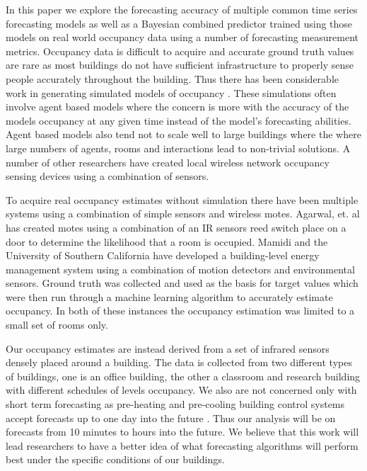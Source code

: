 \documentclass{acm_proc_article-sp}
\begin{document}
In this paper we explore the forecasting accuracy of multiple common time series forecasting models as well as a Bayesian combined predictor trained using those models on real world occupancy data using a number of forecasting measurement metrics.  Occupancy data is difficult to acquire and accurate ground truth values are rare as most buildings do not have sufficient infrastructure to properly sense people accurately throughout the building.  Thus there has been considerable work in generating simulated models of occupancy \cite{PAGE2008, GOLDSTEIN2010}.  These simulations often involve agent based models where the concern is more with the accuracy of the models occupancy at any given time instead of the model's forecasting abilities.   Agent based models also tend not to scale well to large buildings where the where large numbers of agents, rooms and interactions lead to non-trivial solutions. A number of other researchers have created local wireless network occupancy sensing devices using a combination of sensors.  

To acquire real occupancy estimates without simulation there have been multiple systems using a combination of simple sensors and wireless motes.  Agarwal, et. al \cite{Agarwal2010} has created motes using a combination of an IR sensors reed switch place on a door to determine the likelihood that a room is occupied.  Mamidi \cite{Mamidi2012} and the University of Southern California have developed a building-level energy management system using a combination of motion detectors and environmental sensors.  Ground truth was collected and used as the basis for target values which were then run through a machine learning algorithm to accurately estimate occupancy.  In both of these instances the occupancy estimation was limited to a small set of rooms only.

Our occupancy estimates are instead derived from a set of infrared sensors densely placed around a building.  The data is collected from two different types of buildings, one is an office building, the other a classroom and research building with different schedules of levels occupancy.  We also are not concerned only with short term forecasting as pre-heating and pre-cooling building control systems accept forecasts up to one day into the future \cite{Ma2010}.  Thus our analysis will be on forecasts from 10 minutes to hours into the future.  We believe that this work will lead researchers to have a better idea of what forecasting algorithms will perform best under the specific conditions of our buildings.  
\end{document}
